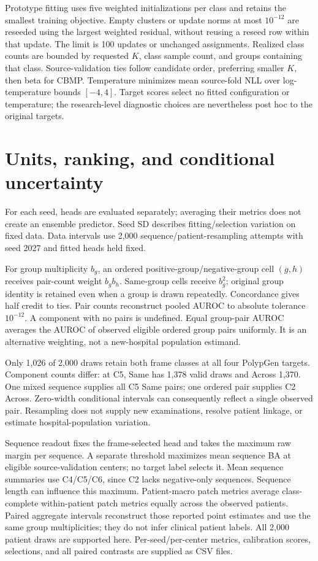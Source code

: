 \documentclass[10pt,letterpaper]{article}
\begin{document}
Prototype fitting uses five weighted initializations per class and retains the smallest training objective. Empty clusters or update norms at most $10^{-12}$ are reseeded using the largest weighted residual, without reusing a reseed row within that update. The limit is 100 updates or unchanged assignments. Realized class counts are bounded by requested $K$, class sample count, and groups containing that class. Source-validation ties follow candidate order, preferring smaller $K$, then beta for CBMP. Temperature minimizes mean source-fold NLL over log-temperature bounds $[-4,4]$. Target scores select no fitted configuration or temperature; the research-level diagnostic choices are nevertheless post hoc to the original targets.

\section{Units, ranking, and conditional uncertainty}
For each seed, heads are evaluated separately; averaging their metrics does not create an ensemble predictor. Seed SD describes fitting/selection variation on fixed data. Data intervals use 2,000 sequence/patient-resampling attempts with seed 2027 and fitted heads held fixed.

For group multiplicity $b_g$, an ordered positive-group/negative-group cell $(g,h)$ receives pair-count weight $b_gb_h$. Same-group cells receive $b_g^2$; original group identity is retained even when a group is drawn repeatedly. Concordance gives half credit to ties. Pair counts reconstruct pooled AUROC to absolute tolerance $10^{-12}$. A component with no pairs is undefined. Equal group-pair AUROC averages the AUROC of observed eligible ordered group pairs uniformly. It is an alternative weighting, not a new-hospital population estimand.

Only 1,026 of 2,000 draws retain both frame classes at all four PolypGen targets. Component counts differ: at C5, Same has 1,378 valid draws and Across 1,370. One mixed sequence supplies all C5 Same pairs; one ordered pair supplies C2 Across. Zero-width conditional intervals can consequently reflect a single observed pair. Resampling does not supply new examinations, resolve patient linkage, or estimate hospital-population variation.

Sequence readout fixes the frame-selected head and takes the maximum raw margin per sequence. A separate threshold maximizes mean sequence BA at eligible source-validation centers; no target label selects it. Mean sequence summaries use C4/C5/C6, since C2 lacks negative-only sequences. Sequence length can influence this maximum. Patient-macro patch metrics average class-complete within-patient patch metrics equally across the observed patients. Paired aggregate intervals reconstruct those reported point estimates and use the same group multiplicities; they do not infer clinical patient labels. All 2,000 patient draws are supported here. Per-seed/per-center metrics, calibration scores, selections, and all paired contrasts are supplied as CSV files.
\end{document}
